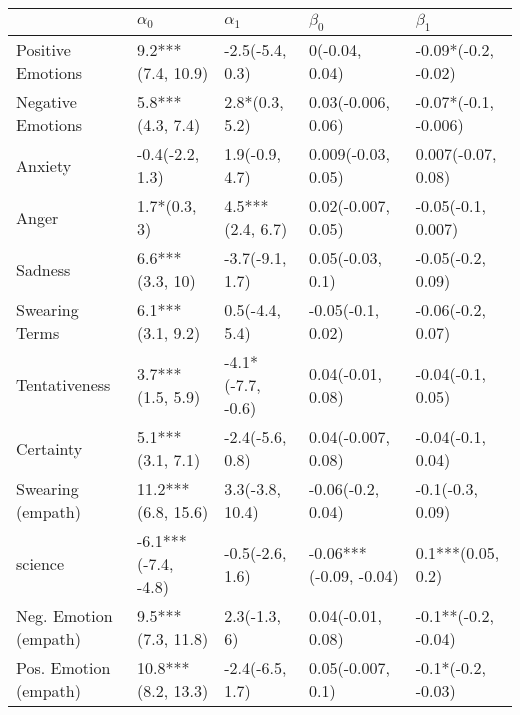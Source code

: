 \begin{tabular}{lllll}
\toprule
{} &           $\alpha_0$ &         $\alpha_1$ &               $\beta_0$ &             $\beta_1$ \\
\midrule
Positive Emotions     &    9.2***(7.4, 10.9) &    -2.5(-5.4, 0.3) &          0(-0.04, 0.04) &   -0.09*(-0.2, -0.02) \\
Negative Emotions     &     5.8***(4.3, 7.4) &     2.8*(0.3, 5.2) &      0.03(-0.006, 0.06) &  -0.07*(-0.1, -0.006) \\
Anxiety               &      -0.4(-2.2, 1.3) &     1.9(-0.9, 4.7) &      0.009(-0.03, 0.05) &    0.007(-0.07, 0.08) \\
Anger                 &         1.7*(0.3, 3) &   4.5***(2.4, 6.7) &      0.02(-0.007, 0.05) &    -0.05(-0.1, 0.007) \\
Sadness               &      6.6***(3.3, 10) &    -3.7(-9.1, 1.7) &        0.05(-0.03, 0.1) &     -0.05(-0.2, 0.09) \\
Swearing Terms        &     6.1***(3.1, 9.2) &     0.5(-4.4, 5.4) &       -0.05(-0.1, 0.02) &     -0.06(-0.2, 0.07) \\
Tentativeness         &     3.7***(1.5, 5.9) &  -4.1*(-7.7, -0.6) &       0.04(-0.01, 0.08) &     -0.04(-0.1, 0.05) \\
Certainty             &     5.1***(3.1, 7.1) &    -2.4(-5.6, 0.8) &      0.04(-0.007, 0.08) &     -0.04(-0.1, 0.04) \\
Swearing (empath)     &   11.2***(6.8, 15.6) &    3.3(-3.8, 10.4) &       -0.06(-0.2, 0.04) &      -0.1(-0.3, 0.09) \\
science               &  -6.1***(-7.4, -4.8) &    -0.5(-2.6, 1.6) &  -0.06***(-0.09, -0.04) &     0.1***(0.05, 0.2) \\
Neg. Emotion (empath) &    9.5***(7.3, 11.8) &       2.3(-1.3, 6) &       0.04(-0.01, 0.08) &   -0.1**(-0.2, -0.04) \\
Pos. Emotion (empath) &   10.8***(8.2, 13.3) &    -2.4(-6.5, 1.7) &       0.05(-0.007, 0.1) &    -0.1*(-0.2, -0.03) \\
\bottomrule
\end{tabular}
